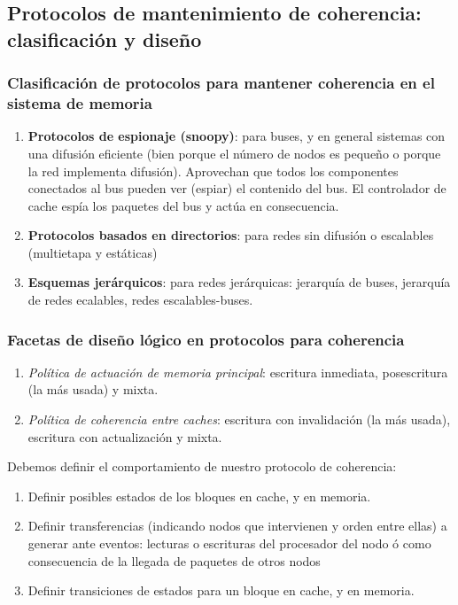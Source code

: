 \documentclass[10pt,a4paper,spanish]{report}
\begin{document}
\textcolor[rgb]{0.2,0.4,0.8}{\subsection{Protocolos de mantenimiento de coherencia: clasificación y diseño}}
\textcolor[rgb]{0.2,0.4,0.8}{\subsubsection{Clasificación de protocolos para mantener coherencia en el sistema de memoria}}
\begin{enumerate}[\color{azul}{\bf $\heartsuit$}]
    \item \textcolor[rgb]{0.2,0.4,0.8}{\textbf{Protocolos de espionaje (snoopy)}}: para buses, y en general sistemas con una difusión eficiente (bien porque el número de nodos es pequeño o porque la red implementa difusión). Aprovechan que todos los componentes conectados al bus pueden ver (espiar) el contenido del bus. El controlador de cache espía los paquetes del bus y actúa en consecuencia.
    \item \textcolor[rgb]{0.2,0.4,0.8}{\textbf{Protocolos basados en directorios}}: para redes sin difusión o escalables (multietapa y estáticas)
    \item \textcolor[rgb]{0.2,0.4,0.8}{\textbf{Esquemas jerárquicos}}: para redes jerárquicas: jerarquía de buses, jerarquía de redes ecalables, redes escalables-buses.
\end{enumerate}

\textcolor[rgb]{0.2,0.4,0.8}{\subsubsection{Facetas de diseño lógico en protocolos para coherencia}}
\begin{enumerate}[\color{azul}{\bf $\heartsuit$}]
    \item \textcolor[rgb]{0.2,0.4,0.8}{\textit{Política de actuación de memoria principal}}: escritura inmediata, posescritura (la más usada) y mixta.
    \item \textcolor[rgb]{0.2,0.4,0.8}{\textit{Política de coherencia entre caches}}: escritura con invalidación (la más usada), escritura con actualización y mixta.
\end{enumerate}

Debemos definir el comportamiento de nuestro protocolo de coherencia:
\begin{enumerate}[\color{azul}{\bf $\heartsuit$}]
    \item Definir posibles estados de los bloques en cache, y en memoria.
    \item Definir transferencias (indicando nodos que intervienen y orden entre ellas) a generar ante eventos: lecturas o escrituras del procesador del nodo ó como consecuencia de la llegada de paquetes de otros nodos
    \item Definir transiciones de estados para un bloque en cache, y en memoria.
\end{enumerate}
\end{document}
